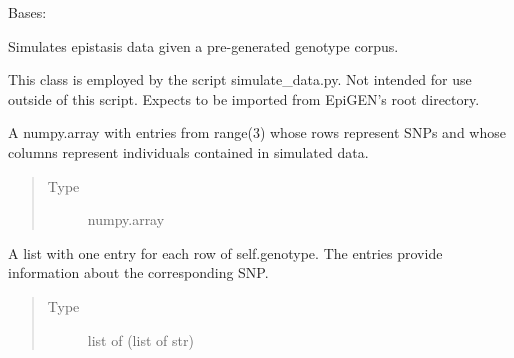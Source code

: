 \documentclass[a4paper,10pt,english]{sphinxhowto}
\begin{document}
\begin{fulllineitems}
\label{\detokenize{utils:utils.data_simulator.DataSimulator}}
Bases: 

Simulates epistasis data given a pre-generated genotype corpus.

This class is employed by the script simulate\_data.py.
Not intended for use outside of this script.
Expects to be imported from EpiGEN’s root directory.

\begin{fulllineitems}
\label{\detokenize{utils:utils.data_simulator.DataSimulator.genotype}}
A numpy.array with entries from range(3) whose rows represent SNPs and whose
columns represent individuals contained in simulated data.
\begin{quote}\begin{description}
\item[{Type}] \leavevmode
numpy.array

\end{description}\end{quote}

\end{fulllineitems}


\begin{fulllineitems}
\label{\detokenize{utils:utils.data_simulator.DataSimulator.snps}}
A list with one entry for each row of self.genotype. The entries provide information
about the corresponding SNP.
\begin{quote}\begin{description}
\item[{Type}] \leavevmode
list of (list of str)

\end{description}\end{quote}


\end{fulllineitems}
\end{fulllineitems}
\end{document}
